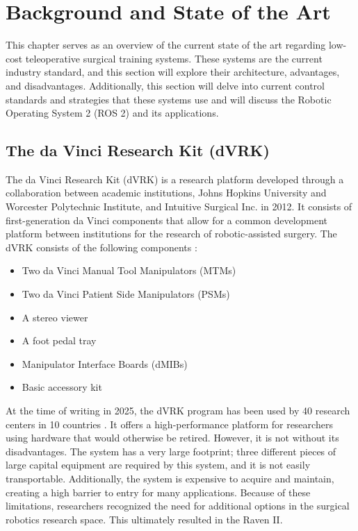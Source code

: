 \chapter{Background and State of the Art}
This chapter serves as an overview of the current state of the art regarding low-cost teleoperative surgical training systems. These systems are the current industry standard, and this section will explore their architecture, advantages, and disadvantages. Additionally, this section will delve into current control standards and strategies that these systems use and will discuss the Robotic Operating System 2 (ROS 2) and its applications.

\section{The da Vinci Research Kit (dVRK)}  
The da Vinci Research Kit (dVRK) is a research platform developed through a collaboration between academic institutions, Johns Hopkins University and Worcester Polytechnic Institute, and Intuitive Surgical Inc. in 2012. It consists of first-generation da Vinci components that allow for a common development platform between institutions for the research of robotic-assisted surgery. The dVRK consists of the following components \cite{DVRKComponents}:  

\begin{itemize}  
    \item Two da Vinci Manual Tool Manipulators (MTMs)  
    \item Two da Vinci Patient Side Manipulators (PSMs)  
    \item A stereo viewer  
    \item A foot pedal tray  
    \item Manipulator Interface Boards (dMIBs)  
    \item Basic accessory kit  
\end{itemize}  

At the time of writing in 2025, the dVRK program has been used by 40 research centers in 10 countries \cite{DVRKRTD}. It offers a high-performance platform for researchers using hardware that would otherwise be retired. However, it is not without its disadvantages. The system has a very large footprint; three different pieces of large capital equipment are required by this system, and it is not easily transportable. Additionally, the system is expensive to acquire and maintain, creating a high barrier to entry for many applications. Because of these limitations, researchers recognized the need for additional options in the surgical robotics research space. This ultimately resulted in the Raven II.

